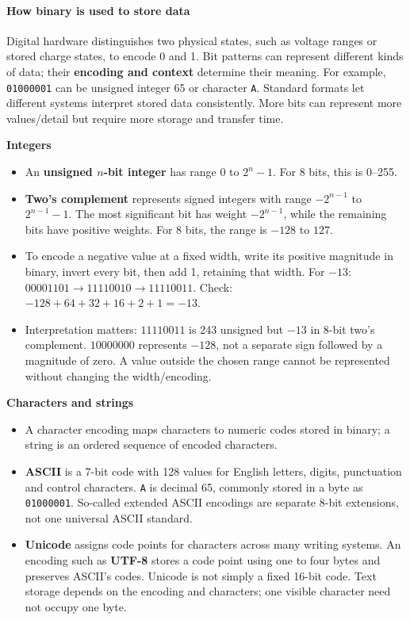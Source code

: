 \documentclass[a4paper,12pt]{article}
\begin{document}
\paragraph{How binary is used to store data}
Digital hardware distinguishes two physical states, such as voltage ranges or stored charge states, to encode 0 and 1. Bit patterns can represent different kinds of data; their \textbf{encoding and context} determine their meaning. For example, \texttt{01000001} can be unsigned integer 65 or character \texttt{A}. Standard formats let different systems interpret stored data consistently. More bits can represent more values/detail but require more storage and transfer time.

\textbf{Integers}
\begin{itemize}
    \item An \textbf{unsigned $n$-bit integer} has range $0$ to $2^n-1$. For 8 bits, this is 0--255.
    \item \textbf{Two's complement} represents signed integers with range $-2^{n-1}$ to $2^{n-1}-1$. The most significant bit has weight $-2^{n-1}$, while the remaining bits have positive weights. For 8 bits, the range is $-128$ to $127$.
    \item To encode a negative value at a fixed width, write its positive magnitude in binary, invert every bit, then add 1, retaining that width. For $-13$: $00001101\to11110010\to11110011$. Check: $-128+64+32+16+2+1=-13$.
    \item Interpretation matters: $11110011$ is 243 unsigned but $-13$ in 8-bit two's complement. $10000000$ represents $-128$, not a separate sign followed by a magnitude of zero. A value outside the chosen range cannot be represented without changing the width/encoding.
\end{itemize}

\textbf{Characters and strings}
\begin{itemize}
    \item A character encoding maps characters to numeric codes stored in binary; a string is an ordered sequence of encoded characters.
    \item \textbf{ASCII} is a 7-bit code with 128 values for English letters, digits, punctuation and control characters. \texttt{A} is decimal 65, commonly stored in a byte as \texttt{01000001}. So-called extended ASCII encodings are separate 8-bit extensions, not one universal ASCII standard.
    \item \textbf{Unicode} assigns code points for characters across many writing systems. An encoding such as \textbf{UTF-8} stores a code point using one to four bytes and preserves ASCII's codes. Unicode is not simply a fixed 16-bit code. Text storage depends on the encoding and characters; one visible character need not occupy one byte.
\end{itemize}
\end{document}
